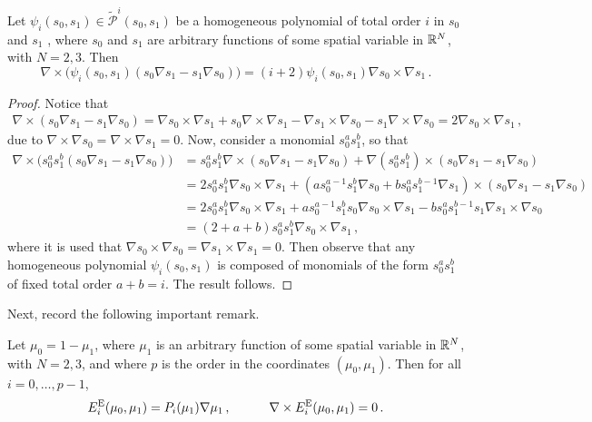 \begin{lemma}
\label{lem:curlformula}
Let $\psi_i(s_0,s_1)\in\tilde{\mathcal{P}}^i(s_0,s_1)$ be a homogeneous polynomial of total order $i$ in $s_0$ and $s_1$ , where $s_0$ and $s_1$ are arbitrary functions of some spatial variable in $\mathbb{R}^N$, with $N=2,3$. Then
\begin{equation*}
    \nabla\times\Big(\psi_i(s_0,s_1)(s_0\nabla s_1-s_1\nabla s_0)\Big)=(i+2)\psi_i(s_0,s_1)\nabla s_0\times\nabla s_1\,.
\end{equation*}
\end{lemma}
\begin{proof}
Notice that
\begin{align*}
    \nabla\times(s_0\nabla s_1-s_1\nabla s_0)=\nabla s_0\times\nabla s_1+s_0\nabla\times\nabla s_1
        -\nabla s_1\times\nabla s_0-s_1\nabla\times\nabla s_0=2\nabla s_0\times\nabla s_1\,,
\end{align*}
due to $\nabla\times\nabla s_0=\nabla\times\nabla s_1=0$. Now, consider a monomial $s_0^as_1^b$, so that
\begin{align*}
    \nabla\times\Big(s_0^as_1^b(s_0\nabla s_1-s_1\nabla s_0)\Big)
        &=s_0^as_1^b\nabla\times(s_0\nabla s_1-s_1\nabla s_0)+\nabla(s_0^as_1^b)\times(s_0\nabla s_1-s_1\nabla s_0)\\
        &=2s_0^as_1^b\nabla s_0\times\nabla s_1
            +(as_0^{a-1}s_1^b\nabla s_0+bs_0^{a}s_1^{b-1}\nabla s_1)\times(s_0\nabla s_1-s_1\nabla s_0)\\
        &=2s_0^as_1^b\nabla s_0\times\nabla s_1+as_0^{a-1}s_1^bs_0\nabla s_0\times\nabla s_1
            -bs_0^{a}s_1^{b-1}s_1\nabla s_1\times\nabla s_0\\
        &=(2+a+b)s_0^as_1^b\nabla s_0\times\nabla s_1\,,
\end{align*}
where it is used that $\nabla s_0\times \nabla s_0=\nabla s_1\times \nabla s_1=0$. Then observe that any homogeneous polynomial $\psi_i(s_0,s_1)$ is composed of monomials of the form $s_0^as_1^b$ of fixed total order $a+b=i$. The result follows.
\end{proof}

Next, record the following important remark.

\begin{remark}
Let $\mu_0=1-\mu_1$, where $\mu_1$ is an arbitrary function of some spatial variable in $\mathbb{R}^N$, with $N=2,3$, and where $p$ is the order in the coordinates $(\mu_0,\mu_1)$. Then for all $i=0,\ldots,p-1$,
\begin{equation}
    E_i^{\mathrm{E}}(\mu_0,\mu_1)=P_i(\mu_1)\nabla\mu_1\,,\quad\qquad \nabla\times E_i^{\mathrm{E}}(\mu_0,\mu_1)=0\,.\label{eq:Hcurl1Dspecialcase}
\end{equation}
\end{remark}

